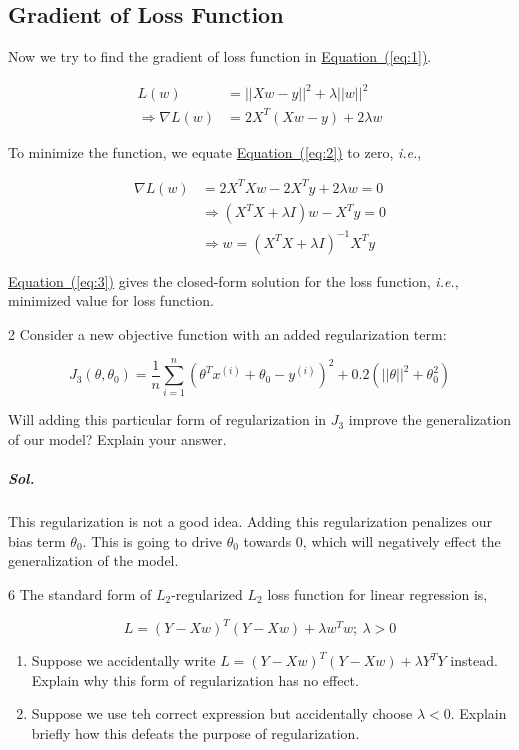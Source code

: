 \documentclass{scrartcl}
\newcounter{prob}
\renewcommand{\eqref}[1]{\hyperref[#1]{Equation~(\ref*{#1})}}
\begin{document}
	\subsection{Gradient of Loss Function}
	
	Now we try to find the gradient of loss function in \eqref{eq:1}.
	
	\begin{align}
		L(w)&=||Xw-y||^2+\lambda||w||^2 \nonumber\\ 
		\Rightarrow \nabla L(w)&=2X^T(Xw-y)+2\lambda w \label{eq:2}
	\end{align}
	
	To minimize the function, we equate \eqref{eq:2} to zero, \textit{i.e.},
	
	\begin{align}
		\nabla L(w)&=2X^TXw-2X^Ty+2\lambda w=0\nonumber\\
		&\Rightarrow (X^TX+\lambda I)w-X^Ty=0\nonumber \\
		&\Rightarrow \boxed{w=(X^TX+\lambda I)^{-1}X^Ty} \label{eq:3}
	\end{align}
	
	\eqref{eq:3} gives the closed-form solution for the loss function, \textit{i.e.}, minimized value for loss function.
	
	\begin{prob}{2}
		Consider a new objective function with an added regularization term:
		
		\[
			J_3(\theta,\theta_0)=\frac1n\sum_{i=1}^{n}(\theta^Tx^{(i)}+\theta_0-y^{(i)})^2+0.2(||\theta||^2+\theta_0^2)
		\]
		
		Will adding this particular form of regularization in \(J_3\) improve the generalization of our model? Explain your answer.
	\end{prob}
	
	\subparagraph{Sol.} This regularization is not a good idea. Adding this regularization penalizes our bias term \(\theta_0\). This is going to drive \(\theta_0\) towards \(0\), which will negatively effect the generalization of the model.
	
	\begin{prob}{6}
		The standard form of \(L_2\)-regularized \(L_2\) loss function for linear regression is,
		
		\[
			L=(Y-Xw)^T(Y-Xw)+\lambda w^Tw;\ \lambda>0
		\]
		
		\begin{enumerate}[label*=(\alph*)]
			\item Suppose we accidentally write \(L=(Y-Xw)^T(Y-Xw)+\lambda Y^TY\) instead. Explain why this form of regularization has no effect.
			
			\item  Suppose we use teh correct expression but accidentally choose $\lambda<0$. Explain briefly how this defeats the purpose of regularization.
		\end{enumerate}
	\end{prob}
	
\end{document}
